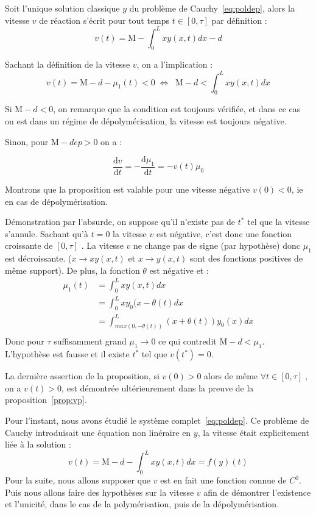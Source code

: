 \documentclass[a4paper]{article}
\newcommand{\mass}{\mathrm{M}}
\newcommand{\dep}{d}
\begin{document}
\begin{preuve}
	Soit l'unique solution classique $y$ du problème de Cauchy~\eqref{eq:poldep}, 
	alors la vitesse $v$ de réaction s'écrit pour tout temps $t \in [0,\tau]$ par définition :
	\[v(t) = \mass -\int_0^L x y(x,t)dx -\dep\]
	 
 	Sachant la définition de la vitesse $v$, on a l'implication :
 	\[ v(t) = \mass -\dep - \mu_1(t) <0 \; \iff \; \; \mass-\dep < \int_0^L x y(x,t)dx  \]
	
	Si $\mass-\dep < 0 $, on remarque que la condition est toujours vérifiée, 
	et dans ce cas on est dans un régime de dépolymérisation, 
	la vitesse est toujours négative.
	
	Sinon, pour $\mass-dep > 0$ on a :
	
	\[ \frac{\mathrm{d} v }{\mathrm{d}t} =  - \frac{\mathrm{d} \mu_1 }{\mathrm{d}t} = - v(t) \mu_{0} \]
	
	Montrons que la proposition est valable pour une vitesse négative $v(0)<0$, ie en cas de dépolymérisation.
	
	Démonstration par l'absurde, on suppose qu'il n'existe pas de $t^*$ tel que la vitesse s'annule.
	Sachant qu'à $t=0$ la vitesse $v$ est négative, 
	c'est donc une fonction croissante de $[0,\tau]$ .
	La vitesse $v$ ne change pas de signe (par hypothèse) donc $\mu_1$ est décroissante.
	($x \to xy (x,t)$ et $x \to y(x,t)$ sont des fonctions positives de même support). 
	De plus, la fonction $\theta$ est négative et :
	\[ 
	\begin{split}
		\mu_1(t) & = \int_0^L x y(x,t)dx \\
		      & = \int_0^L x y_0(x-\theta(t) dx \\
		      & = \int_{max(0,-\theta(t))}^{L} (x+\theta(t)) y_0(x) dx \\
	\end{split}
	\]
	Donc pour $\tau$ suffisamment grand $\mu_1 \rightarrow 0$ ce qui contredit $ \mass-\dep < \mu_1$.
	L'hypothèse est fausse et il existe $t^*$ tel que $v(t^*)=0$.
	
	La dernière assertion de la proposition, 
	si $v(0) >0$ alors de même $\forall t \in [0,\tau] \;, \;$ on a $v(t) >0$,
	est démontrée ultérieurement dans la preuve de la proposition~\ref{prop:vp}.
	
\end{preuve}


\begin{remarque}
Pour l'instant, nous avons étudié le système complet~\eqref{eq:poldep}. 
Ce problème de Cauchy introduisait une équation non linéraire en $y$, 
la vitesse était explicitement liée à la solution :
\[ v(t) = \mass - \dep - \int_0^L xy(x,t)dx = f(y)(t) \]
Pour la suite, nous allons supposer que $v$ est en fait une fonction connue de $C^0$.
Puis nous allons faire des hypothèses sur la vitesse $v$ 
afin de démontrer l'existence et l'unicité, dans le cas de la polymérisation, puis de la dépolymérisation.
\end{remarque}
\end{document}
